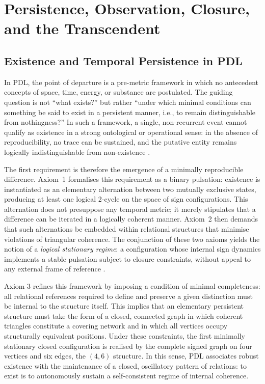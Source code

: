 \documentclass[11pt,a4paper]{article}
\begin{document}
\section{Persistence, Observation, Closure, and the Transcendent}

\subsection{Existence and Temporal Persistence in PDL}

In PDL, the point of departure is a pre-metric framework in which no antecedent concepts of space, time, energy, or substance are postulated. The guiding question is not “what exists?” but rather “under which minimal conditions can something be said to exist in a persistent manner, i.e., to remain distinguishable from nothingness?” In such a framework, a single, non-recurrent event cannot qualify as existence in a strong ontological or operational sense: in the absence of reproducibility, no trace can be sustained, and the putative entity remains logically indistinguishable from non-existence \cite{Laubscher_LDP_fr}.  

The first requirement is therefore the emergence of a minimally reproducible difference. Axiom~1 formalises this requirement as a binary pulsation: existence is instantiated as an elementary alternation between two mutually exclusive states, producing at least one logical 2-cycle on the space of sign configurations. This alternation does not presuppose any temporal metric; it merely stipulates that a difference can be iterated in a logically coherent manner. Axiom~2 then demands that such alternations be embedded within relational structures that minimise violations of triangular coherence. The conjunction of these two axioms yields the notion of a \emph{logical stationary regime}: a configuration whose internal sign dynamics implements a stable pulsation subject to closure constraints, without appeal to any external frame of reference \cite{Laubscher_PDL_long,Laubscher_PDL_IMRad}.

Axiom 3 refines this framework by imposing a condition of minimal completeness: all relational references required to define and preserve a given distinction must be internal to the structure itself. This implies that an elementary persistent structure must take the form of a closed, connected graph in which coherent triangles constitute a covering network and in which all vertices occupy structurally equivalent positions. Under these constraints, the first minimally stationary closed configuration is realised by the complete signed graph on four vertices and six edges, the \((4,6)\) structure. In this sense, PDL associates robust existence with the maintenance of a closed, oscillatory pattern of relations: to exist is to autonomously sustain a self-consistent regime of internal coherence.
\end{document}
